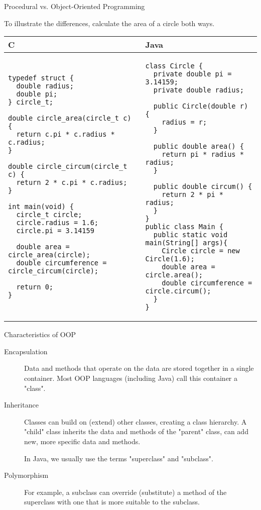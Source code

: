 \documentclass{beamer}
\begin{document}
\begin{frame}[fragile]{Procedural vs. Object-Oriented Programming}

To illustrate the differences, calculate the area of a circle both ways.

\centering
\begin{tabular}{@{}m{} | m{}@{}}
C					&					Java	\\
\hline
\begin{Verbatim}[fontsize=\tiny]
typedef struct {
  double radius;
  double pi;
} circle_t;

double circle_area(circle_t c) {
  return c.pi * c.radius * c.radius;
}

double circle_circum(circle_t c) {
  return 2 * c.pi * c.radius;
}

int main(void) {
  circle_t circle;
  circle.radius = 1.6;
  circle.pi = 3.14159
  
  double area = circle_area(circle);
  double circumference = circle_circum(circle);
	
  return 0;
}
\end{Verbatim}	

&

\begin{Verbatim}[fontsize=\tiny]
class Circle {
  private double pi = 3.14159;
  private double radius;
  
  public Circle(double r) {
    radius = r;
  }
  
  public double area() {
    return pi * radius * radius;
  }
  
  public double circum() {
    return 2 * pi * radius;
  }
}
public class Main {
  public static void main(String[] args){
    Circle circle = new Circle(1.6);
    double area = circle.area();
    double circumference = circle.circum();
  }
}
\end{Verbatim}	

\end{tabular}

\end{frame}

\begin{frame}{Characteristics of OOP}
	\begin{description}
		\item[Encapsulation]
		Data and methods that operate on the data are stored together in a single container. Most OOP languages (including Java) call this container a "class".
		
		\item[Inheritance]
		Classes can build on (extend) other classes, creating a class hierarchy. A "child" class inherits the data and methods of the "parent" class, can add new, more specific data and methods.
		
		In Java, we usually use the terms "superclass" and "subclass".
		
		\item[Polymorphism]
		For example, a subclass can override (substitute) a method of the superclass with one that is more suitable to the subclass.
		
	\end{description}
\end{frame}
\end{document}
